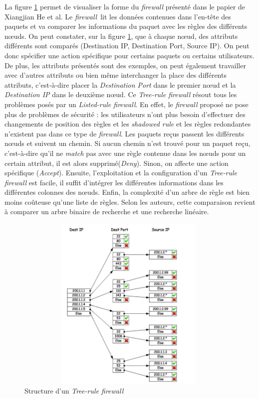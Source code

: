 La figure \ref{label-image7} permet de visualiser la forme du \textit{firewall} présenté dans le papier de Xiangjian He et al. Le \textit{firewall} lit les données contenues dans l'en-tête des paquets et va comparer les informations du paquet avec les règles des différents nœuds. On peut constater, sur la figure \ref{label-image7}, que à chaque nœud, des attributs différents sont comparés (Destination IP, Destination Port, Source IP). On peut donc spécifier une action spécifique pour certains paquets ou certains utilisateurs. De plus, les attributs présentés sont des exemples, on peut également travailler avec d'autres attributs ou bien même interchanger la place des différents attributs, c'est-à-dire placer la \textit{Destination Port} dans le premier nœud et la \textit{Destination IP} dans le deuxième nœud. Ce \textit{Tree-rule firewall} résout tous les problèmes posés par un \textit{Listed-rule firewall}. En effet, le \textit{firewall} proposé ne pose plus de problèmes de sécurité : les utilisateurs n'ont plus besoin d'effectuer des changements de position des règles et les \textit{shadowed rule} et les règles redondantes n'existent pas dans ce type de \textit{firewall}. Les paquets reçus passent les différents nœuds et suivent un chemin. Si aucun chemin n'est trouvé pour un paquet reçu, c'est-à-dire qu'il ne \textit{match} pas avec une règle contenue dans les nœuds pour un certain attribut, il est alors supprimé(\textit{Deny}). Sinon, on affecte une action spécifique (\textit{Accept}). Ensuite, l'exploitation et la configuration d'un \textit{Tree-rule firewall} est facile, il suffit d'intégrer les différentes informations dans les différentes colonnes des nœuds. Enfin, la complexité d'un arbre de règle est bien moins coûteuse qu'une liste de règles. Selon les auteurs, cette comparaison revient à comparer un arbre binaire de recherche et une recherche linéaire. 

\begin{figure}[h]
	\center
	\includegraphics[height=8.5cm,width=11cm]{./pics/tree_rule_firewall.png}
	\caption{Structure d'un \textit{Tree-rule firewall} \cite{tree_rule_firewall}}
	\label{label-image7}
\end{figure}

